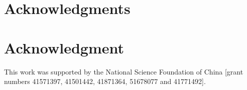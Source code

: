 \documentclass[10pt,journal,compsoc]{IEEEtran}
\begin{document}

%





\ifCLASSOPTIONcompsoc
  \section*{Acknowledgments}
\else
  \section*{Acknowledgment}
\fi

This work was supported by the National Science Foundation of China [grant numbers 41571397, 41501442, 41871364, 51678077 and 41771492].
\end{document}
